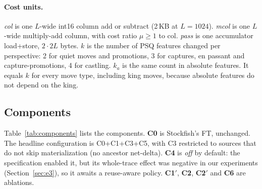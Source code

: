 \documentclass[10pt]{article}
\theoremstyle{plain}
\theoremstyle{definition}
\begin{document}
\paragraph{Cost units.}
\emph{col} is one $L$-wide int16 column add or subtract (2\,KB at $L=1024$).
\emph{mcol} is one $L$-wide multiply-add column, with cost ratio $\mu\geq1$ to col.
\emph{pass} is one accumulator load+store, $2\cdot2L$ bytes.
$k$ is the number of PSQ features changed per perspective: 2 for quiet moves and promotions, 3 for captures, en passant and capture-promotions, 4 for castling.
$k_a$ is the same count in absolute features.
It equals $k$ for every move type, including king moves, because absolute features do not depend on the king.

\subsection{Components}

Table~\ref{tab:components} lists the components.
\textbf{C0} is Stockfish's FT, unchanged.
The headline configuration is C0+C1+C3+C5, with C3 restricted to sources that do not skip materialization (no ancestor net-delta).
\textbf{C4} is \emph{off} by default: the specification enabled it, but its whole-trace effect was negative in our experiments (Section~\ref{sec:e3}), so it awaits a reuse-aware policy.
\textbf{C1$'$}, \textbf{C2}, \textbf{C2$'$} and \textbf{C6} are ablations.
\end{document}
